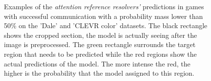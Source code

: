 \begin{figure}[ht]
    \centering
    \caption{Examples of the \emph{attention reference resolvers'} predictions in games with successful communication with a probability mass lower than 50\% on the 'Dale' and 'CLEVR color' datasets. The black rectangle shows the cropped section, the model is actually seeing after the image is preprocessed. The green rectangle surrounds the target region that needs to be predicted while the red regions show the actual predictions of the model. The more intense the red, the higher is the probability that the model assigned to this region.}
    \label{fig:visualizations_game_attention}
\end{figure}

